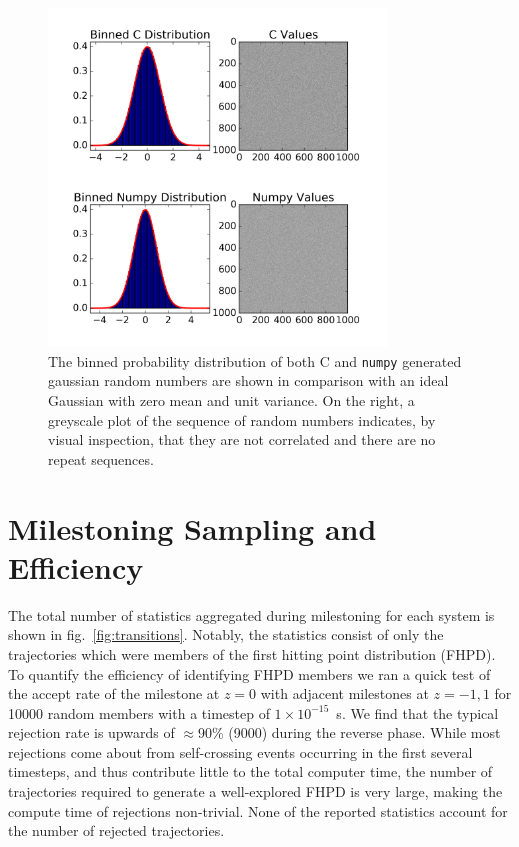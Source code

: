 \documentclass[usetitle=true,journal=jpcbfk,manuscript=suppinfo]{achemso}
\newcommand{\ttt}[1]{\texttt{#1}}
\begin{document}
        \begin{figure}[htbp]
        \begin{center}
            \includegraphics[width=0.8\textwidth]{Figures/testRNG}
            \caption{The binned probability distribution of both C and \ttt{numpy} generated gaussian random numbers are shown in comparison with an ideal Gaussian with zero mean and unit variance. On the right, a greyscale plot of the sequence of random numbers indicates, by visual inspection, that they are not correlated and there are no repeat sequences.}
            \label{fig:testRNG}
        \end{center}
        \end{figure}
   
    \section*{Milestoning Sampling and Efficiency}
        \par The total number of statistics aggregated during milestoning for each system is shown in fig.~\ref{fig:transitions}. Notably, the statistics consist of only the trajectories which were members of the first hitting point distribution (FHPD). To quantify the efficiency of identifying FHPD members we ran a quick test of the accept rate of the milestone at $z=0$ with adjacent milestones at $z=-1,1$ for 10000 random members with a timestep of $1\times 10^{-15}$~s. We find that the typical rejection rate is upwards of $\approx$90\% (9000) during the reverse phase. While most rejections come about from self-crossing events occurring in the first several timesteps, and thus contribute little to the total computer time, the number of trajectories required to generate a well-explored FHPD is very large, making the compute time of rejections non-trivial. None of the reported statistics account for the number of rejected trajectories.
\end{document}
